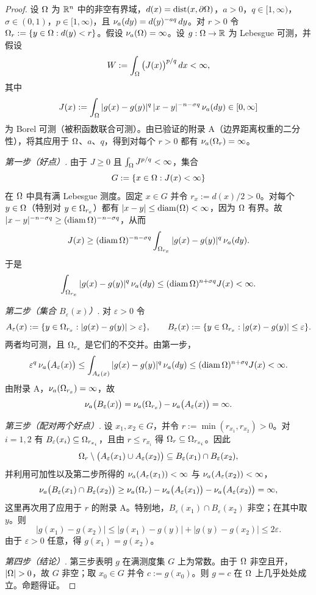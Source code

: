 \begin{proof}
设 $\Omega$ 为 $\mathbb{R}^n$ 中的非空有界域，$d(x)=\operatorname{dist}(x,\partial\Omega)$，$a>0$，$q\in[1,\infty)$，$\sigma\in(0,1)$，$p\in[1,\infty)$，且 $\nu_{a}(dy)=d(y)^{-aq}\,dy$。对 $r>0$ 令 $\Omega_{r}:=\{y\in\Omega : d(y)<r\}$。假设 $\nu_{a}(\Omega)=\infty$。设 $g:\Omega\to\mathbb{R}$ 为 Lebesgue 可测，并假设
\[
  W:=\int_\Omega \big(J(x)\big)^{p/q}\,dx<\infty ,
\]
其中
\[
  J(x):=\int_\Omega |g(x)-g(y)|^q\,|x-y|^{-n-\sigma q}\,\nu_{a}(dy)\in[0,\infty]
\]
为 Borel 可测（被积函数联合可测）。由已验证的附录 A（边界距离权重的二分性），将其应用于 $\Omega$、$a$、$q$，得到对每个 $r>0$ 都有 $\nu_{a}(\Omega_{r})=\infty$。

\emph{第一步（好点）.} 由于 $J\ge 0$ 且 $\int_\Omega J^{p/q}<\infty$，集合
\[
  G:=\{x\in\Omega : J(x)<\infty\}
\]
在 $\Omega$ 中具有满 Lebesgue 测度。固定 $x\in G$ 并令 $r_x:=d(x)/2>0$。对每个 $y\in\Omega$（特别对 $y\in\Omega_{r_x}$）都有 $|x-y|\le\operatorname{diam}(\Omega)<\infty$，因为 $\Omega$ 有界。故 $|x-y|^{-n-\sigma q}\ge(\operatorname{diam}\Omega)^{-n-\sigma q}$，从而
\[
  J(x)\ge(\operatorname{diam}\Omega)^{-n-\sigma q}\int_{\Omega_{r_x}} |g(x)-g(y)|^q\,\nu_{a}(dy) .
\]
于是
\[
  \int_{\Omega_{r_x}} |g(x)-g(y)|^q\,\nu_{a}(dy)\le(\operatorname{diam}\Omega)^{n+\sigma q}J(x)<\infty .
\]

\emph{第二步（集合 $B_\varepsilon(x)$）}. 对 $\varepsilon>0$ 令
\[
  A_\varepsilon(x):=\{y\in\Om_{r_x} : |g(x)-g(y)|>\varepsilon\},
  \qquad
  B_\varepsilon(x):=\{y\in\Om_{r_x} : |g(x)-g(y)|\le\varepsilon\} .
\]
两者均可测，且 $\Omega_{r_x}$ 是它们的不交并。由第一步，
\[
  \varepsilon^q\,\nu_{a}\big(A_\varepsilon(x)\big)
  \le\int_{A_\varepsilon(x)} |g(x)-g(y)|^q\,\nu_{a}(dy)
  \le(\operatorname{diam}\Omega)^{n+\sigma q}J(x)<\infty .
\]
由附录 A，$\nu_{a}(\Omega_{r_x})=\infty$，故
\[
  \nu_{a}\big(B_\varepsilon(x)\big)=\nu_{a}(\Omega_{r_x})-\nu_{a}\big(A_\varepsilon(x)\big)=\infty .
\]

\emph{第三步（配对两个好点）}. 设 $x_1,x_2\in G$，并令 $r:=\min(r_{x_1},r_{x_2})>0$。对 $i=1,2$ 有 $B_\varepsilon(x_i)\subseteq\Omega_{r_{x_i}}$，且由 $r\le r_{x_i}$ 得 $\Omega_{r}\subseteq\Omega_{r_{x_i}}$。因此
\[
  \Omega_{r}\setminus\big(A_\varepsilon(x_1)\cup A_\varepsilon(x_2)\big)\subseteq B_\varepsilon(x_1)\cap B_\varepsilon(x_2),
\]
并利用可加性以及第二步所得的 $\nu_{a}(A_\varepsilon(x_1))<\infty$ 与 $\nu_{a}(A_\varepsilon(x_2))<\infty$，
\[
  \nu_{a}\big(B_\varepsilon(x_1)\cap B_\varepsilon(x_2)\big)
  \ge\nu_{a}(\Omega_{r})-\nu_{a}\big(A_\varepsilon(x_1)\big)-\nu_{a}\big(A_\varepsilon(x_2)\big)=\infty ,
\]
这里再次用了应用于 $r$ 的附录 A。特别地，$B_\varepsilon(x_1)\cap B_\varepsilon(x_2)$ 非空；在其中取 $y$。则
\[
  |g(x_1)-g(x_2)|\le|g(x_1)-g(y)|+|g(y)-g(x_2)|\le 2\varepsilon .
\]
由于 $\varepsilon>0$ 任意，得 $g(x_1)=g(x_2)$。

\emph{第四步（结论）}. 第三步表明 $g$ 在满测度集 $G$ 上为常数。由于 $\Omega$ 非空且开，$|\Om|>0$，故 $G$ 非空；取 $x_0\in G$ 并令 $c:=g(x_0)$。则 $g=c$ 在 $\Omega$ 上几乎处处成立。命题得证。
\end{proof}

